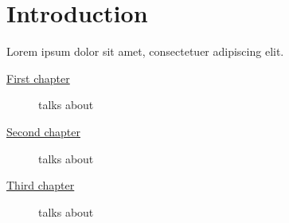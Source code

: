 
\cleardoublepage
{}
\chapter*{Introduction}\label{cap:intro}

\lipsum[1]

Lorem ipsum dolor sit amet, consectetuer adipiscing elit.

\begin{description}
\item[{\hyperref[cap:one]{First chapter}}]
talks about \omissis{}
\item[{\hyperref[cap:two]{Second chapter}}]
talks about \omissis{}
\item[{\hyperref[cap:three]{Third chapter}}]
talks about \omissis{}
\end{description}

